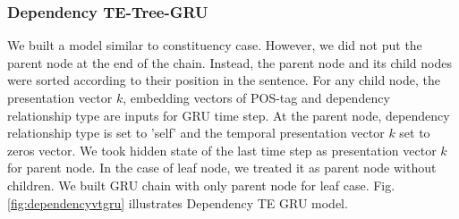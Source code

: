 \subsubsection{Dependency TE-Tree-GRU} \label{sec:VTtreeDependency}
We built a model similar to constituency case. 
However, we did not put the parent node at the end of the chain. 
Instead, the parent node and its child nodes were sorted according to their position in the sentence. 
For any child node, the presentation vector \(k\), embedding vectors of POS-tag and dependency relationship type are inputs for GRU time step. 
At the parent node, dependency relationship type is set to 'self' and the temporal presentation vector \(k\) set to zeros vector. 
We took hidden state of the last time step as presentation vector \(k\) for parent node. 
In the case of leaf node, we treated it as parent node without children. 
We built GRU chain with only parent node for leaf case. 
Fig.\ref{fig:dependencyvtgru} illustrates Dependency TE GRU model.

